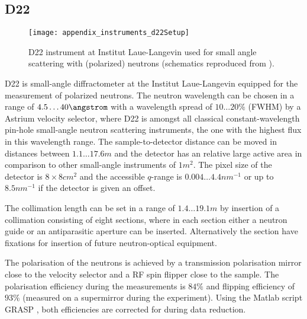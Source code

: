\documentclass[\main/dresen_thesis.tex]{subfiles}
\begin{document}
  \subsection{D22}\label{ch:lss:d22}
    \begin{figure}[ht]
      \centering
      \texttt{[image: appendix\_instruments\_d22Setup]}
      \caption{\label{fig:lss:d22}D22 instrument at Institut Laue-Langevin used for small angle scattering with (polarized) neutrons (schematics reproduced from \cite{Porcar_2018_D22La}).}
    \end{figure}
    D22 \cite{Porcar_2018_D22La} is small-angle diffractometer at the Institut Laue-Langevin equipped for the measurement of polarized neutrons.
    The neutron wavelength can be chosen in a range of $4.5 \ldots 40 \angstrom$ with a wavelength spread of $10 \ldots 20 \unit{\%}$ (FWHM) by a Astrium velocity selector, where D22 is amongst all classical constant-wavelength pin-hole small-angle neutron scattering instruments, the one with the highest flux in this wavelength range.
    The sample-to-detector distance can be moved in distances between $1.1 \ldots 17.6 \unit{m}$ and the detector has an relative large active area in comparison to other small-angle instruments of $1 \unit{m^2}$.
    The pixel size of the detector is $8 \times 8 \unit{cm^2}$ and the accessible $q$-range is $0.004 \ldots 4.4 \unit{nm^{-1}}$ or up to $8.5 \unit{nm^{-1}}$ if the detector is given an offset.

    The collimation length can be set in a range of $1.4 \ldots 19.1 \unit{m}$ by insertion of a collimation consisting of eight sections, where in each section either a neutron guide or an antiparasitic aperture can be inserted.
    Alternatively the section have fixations for insertion of future neutron-optical equipment.

    The polarisation of the neutrons is achieved by a transmission polarisation mirror close to the velocity selector and a RF spin flipper close to the sample.
    The polarisation efficiency during the measurements is $84 \unit{\%}$ and flipping efficiency of $93 \unit{\%}$ (measured on a supermirror during the experiment).
    Using the Matlab script GRASP \cite{Dewhurst_2003_Grasp}, both efficiencies are corrected for during data reduction.
\end{document}
